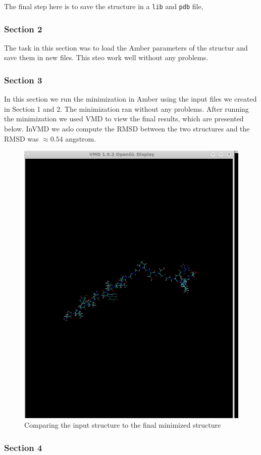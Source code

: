 \documentclass[11pt]{article}
\makeatletter
\def\maxwidth{\ifdim\Gin@nat@width>\linewidth\linewidth
    \else\Gin@nat@width\fi}
\let\Oldincludegraphics\includegraphics
\renewcommand{\includegraphics}[1]{\Oldincludegraphics[width=.8\maxwidth]{#1}}
\makeatother
\begin{document}
The final step here is to save the structure in a \texttt{lib} and
\texttt{pdb} file,

\subsubsection{Section 2}\label{section-2}

The task in this section was to load the Amber parameters of the
structur and save them in new files. This steo work well without any
problems.

\subsubsection{Section 3}\label{section-3}

In this section we run the minimization in Amber using the input files
we created in Section 1 and 2. The minimization ran without any
problems. After running the minimization we used VMD to view the final
results, which are presented below. InVMD we aslo compute the RMSD
between the two structures and the RMSD was \(\approx 0.54\) angstrom.

\begin{figure}
\centering
\includegraphics{Screenshot_input_and_final.png}
\caption{Comparing the input structure to the final minimized structure}
\end{figure}

\subsubsection{Section 4}\label{section-4}


    
    
    
    
\end{document}
